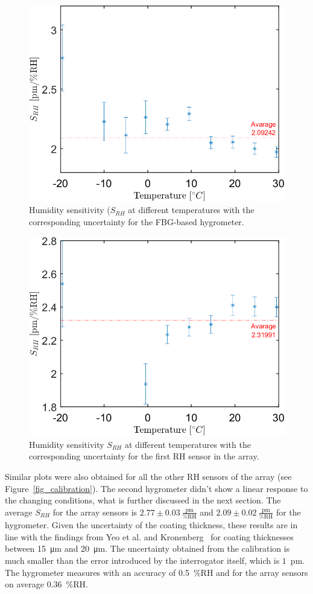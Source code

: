 \begin{figure}[!h]
\centering
\includegraphics[width=0.55\columnwidth]{Chapter5/images/RHS_RH.png}
\caption{Humidity sensitivity ($S_{RH}$ at different temperatures with the corresponding uncertainty for the FBG-based hygrometer.}
\label{fig_RH_sens}
\end{figure}
\begin{figure}[!h]
\centering
\includegraphics[width=0.55\columnwidth]{Chapter5/images/RH1_RH.png}
\caption{Humidity sensitivity $S_{RH}$ at different temperatures with the corresponding uncertainty for the first \gls{RH} sensor in the array.}
\label{fig_RH_sens2}
\end{figure}

Similar plots were also obtained for all the other \gls{RH} sensors of the array (see Figure~\ref{fig_calibration}). The second hygrometer didn't show a linear response to the changing conditions, what is further discussed in the next section.
\newpage
The average $S_{RH}$ for the array sensors is $2.77\pm 0.03~\mathrm{\frac{pm}{\%RH}}$  and $2.09\pm 0.02~\mathrm{\frac{pm}{\%RH}}$ for the hygrometer. Given the uncertainty of the coating thickness, these results are in line with the findings from Yeo et al. and Kronenberg~\cite{Kronenberg:02,YEO_PI} for coating thicknesses between \SI{15}{\micro\metre} and \SI{20}{\micro\metre}. The uncertainty obtained from the calibration is much smaller than the error introduced by the interrogator itself, which is $1$~pm. The hygrometer measures with an accuracy of 0.5~\%RH and for the array sensors on average 0.36~\%RH. 

